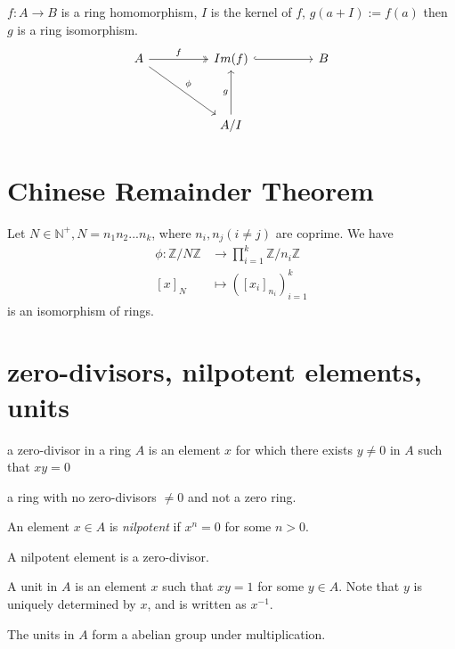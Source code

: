 \documentclass[11pt,fleqn]{book} %
\begin{document}
\begin{CJK}{UTF8}{gkai}
\begin{theorem}
	 $f: A \to B$ is a ring homomorphism, $I$ is the kernel of $f$, $g(a + I) := f(a)$ then $g$ is a ring isomorphism.
	\[\begin{tikzcd}
		A && {Im(f)} && B \\
		\\
		&& {A/I}
		\arrow["f", two heads, from=1-1, to=1-3]
		\arrow[hook, from=1-3, to=1-5]
		\arrow["g", from=3-3, to=1-3]
		\arrow["\phi", from=1-1, to=3-3]
	\end{tikzcd}\]

\end{theorem}

\section{Chinese Remainder Theorem}
\begin{theorem}
	Let $N \in \mathbb{N}^+, N = n_1n_2...n_k$, where $n_i,n_j (i \neq j)$ are coprime. We have 
	\begin{align*}
	\phi:  \mathbb{Z}/N\mathbb{Z} &\to \prod_{i = 1}^{k}\mathbb{Z}/n_i\mathbb{Z}\\
	 [x]_N &\mapsto ([x_i]_{n_i})_{i=1}^k
	\end{align*}
	is an isomorphism of rings.
\end{theorem}

\section{zero-divisors, nilpotent elements, units}
\begin{definition}
	 a zero-divisor in a ring $A$ is an element $x$ for which there exists $y \neq 0$ in $A$ such that $xy = 0$
\end{definition}
\begin{definition}
	 a ring with no zero-divisors $\neq 0$ and not a zero ring.
\end{definition}

\begin{definition}
	[nilpotent] An element $x \in A$ is {\it nilpotent} if $x^n = 0$ for some $n > 0$.
\end{definition}
\begin{remark}
	A nilpotent element is a zero-divisor.
\end{remark}

\begin{definition}
	 A unit in $A$ is an element $x$ such that $xy = 1$ for some $y \in A$. Note that $y$ is uniquely determined by $x$, and is written as $x^{-1}$. 
\end{definition}
\begin{remark}
	The units in $A$ form a abelian group under multiplication.
\end{remark}


\end{CJK}
\end{document}
